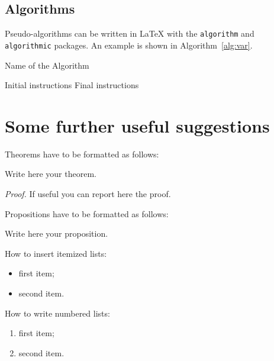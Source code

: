 \documentclass[11pt,a4paper]{article}
\begin{document}
\subsection{Algorithms}
\label{subsec:algorithms}

Pseudo-algorithms can be written in \LaTeX{} with the \texttt{algorithm} and \texttt{algorithmic} packages.
An example is shown in Algorithm~\ref{alg:var}.
\begin{algorithm}[H]
    \label{alg:example}
    \caption{Name of the Algorithm}
    \label{alg:var}
    \label{protocol1}
    \begin{algorithmic}[1]
        \STATE Initial instructions
        \ENDIF
        \ENDFOR
        \ENDWHILE
        \STATE Final instructions
    \end{algorithmic}
\end{algorithm}

\section{Some further useful suggestions}

Theorems have to be formatted as follows:
\begin{theorem}
    \label{a_theorem}
    Write here your theorem.
\end{theorem}
\textit{Proof.} If useful you can report here the proof.
\vspace{0.3cm} %

Propositions have to be formatted as follows:
\begin{proposition}
    Write here your proposition.
\end{proposition}
\vspace{0.3cm} %

How to insert itemized lists:
\begin{itemize}
    \item first item;
    \item second item.
\end{itemize}
How to write numbered lists:
\begin{enumerate}
    \item first item;
    \item second item.
\end{enumerate}
\end{document}
